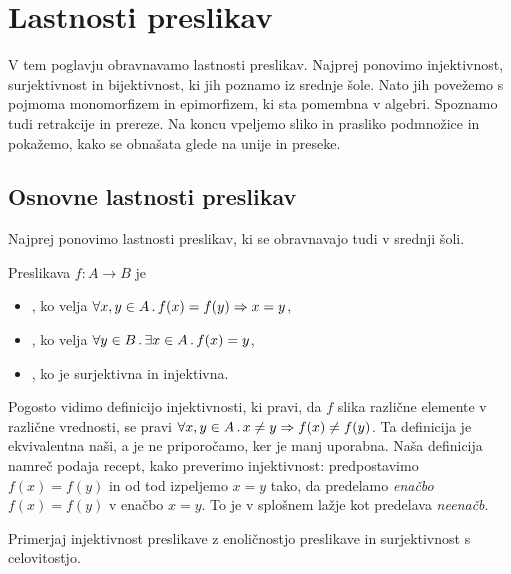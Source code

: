 \chapter{Lastnosti preslikav}
\label{cha:lastnosti-preslikav}

V tem poglavju obravnavamo lastnosti preslikav.
%
Najprej ponovimo injektivnost, surjektivnost in bijektivnost, ki jih poznamo iz srednje šole.
%
Nato jih povežemo s pojmoma monomorfizem in epimorfizem, ki sta pomembna v algebri.
%
Spoznamo tudi retrakcije in prereze.
%
Na koncu vpeljemo sliko in prasliko podmnožice in pokažemo, kako se obnašata glede na unije in preseke.

\section{Osnovne lastnosti preslikav}
\label{sec:osnovne-lastnosti-preslikav}

Najprej ponovimo lastnosti preslikav, ki se obravnavajo tudi v srednji šoli.

\begin{definicija}
  \label{def:injektivna-surjektivna-bijektivna}
  Preslikava $f : A \to B$ je
  \begin{itemize}
  \item {}, ko velja $\forall x, y \in A \,.\, f(x) = f(y) \Rightarrow x = y$,
  \item {}, ko velja $\forall y \in B \,.\, \exists x \in A \,.\, f(x) = y$,
  \item {}, ko je surjektivna in injektivna.
  \end{itemize}
\end{definicija}

\begin{opomba}
  Pogosto vidimo definicijo injektivnosti, ki pravi, da $f$ slika različne elemente v različne vrednosti, se pravi $\forall x, y \in A \,.\, x \neq y \Rightarrow f(x) \neq f(y)$. Ta definicija je ekvivalentna naši, a je ne priporočamo, ker je manj uporabna.
  Naša definicija namreč podaja recept, kako preverimo injektivnost: predpostavimo $f(x) = f(y)$ in od tod izpeljemo
  $x = y$ tako, da predelamo \emph{enačbo} $f(x) = f(y)$ v enačbo $x = y$. To je v splošnem lažje kot predelava \emph{neenačb}.
\end{opomba}

\begin{vaja}
  Primerjaj injektivnost preslikave z enoličnostjo preslikave in surjektivnost s celovitostjo.
\end{vaja}

